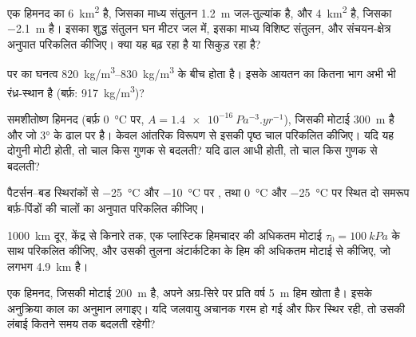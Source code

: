 \begin{exercise}[$\star$]\label{exo:b3:glaciology:3}
एक हिमनद का  \qty{6}{km^2} है, जिसका माध्य संतुलन
\qty{+1.2}{m} जल-तुल्यांक है, और  \qty{4}{km^2} है, जिसका
\qty{-2.1}{m} है। इसका शुद्ध संतुलन घन मीटर जल में, इसका माध्य विशिष्ट संतुलन,
और संचयन-क्षेत्र अनुपात परिकलित कीजिए। क्या यह बढ़ रहा है या
सिकुड़ रहा है?
\end{exercise}

\begin{exercise}[$\star$]\label{exo:b3:glaciology:4}
 पर  का घनत्व \qtyrange{820}{830}{kg/m^3} के बीच होता है।
इसके आयतन का कितना भाग अभी भी रंध्र-स्थान है (बर्फ़:
\qty{917}{kg/m^3})?
\end{exercise}

\begin{exercise}[$\star\star$]\label{exo:b3:glaciology:5}
समशीतोष्ण हिमनद (बर्फ़ \qty{0}{\celsius} पर, $A =
\qty{1.4e-16}{Pa^{-3}.yr^{-1}}$), जिसकी मोटाई \qty{300}{m} है और जो
\ang{3} के ढाल पर है। केवल आंतरिक विरूपण से इसकी पृष्ठ चाल परिकलित कीजिए।
यदि यह दोगुनी मोटी होती, तो चाल किस गुणक से बदलती? यदि ढाल
आधी होती, तो चाल किस गुणक से बदलती?
\end{exercise}

\begin{exercise}[$\star\star$]\label{exo:b3:glaciology:6}
पैटर्सन--बड स्थिरांकों से \qty{-25}{\celsius} और \qty{-10}{\celsius} पर , तथा
\qty{0}{\celsius} और \qty{-25}{\celsius} पर स्थित दो समरूप बर्फ़-पिंडों की चालों का अनुपात
परिकलित कीजिए।
\end{exercise}

\begin{exercise}[$\star\star$]\label{exo:b3:glaciology:7}
\qty{1000}{km} दूर, केंद्र से किनारे तक, एक प्लास्टिक हिमचादर की अधिकतम मोटाई
$\tau_0 = \qty{100}{kPa}$ के साथ परिकलित कीजिए, और उसकी तुलना अंटार्कटिका के
हिम की अधिकतम मोटाई से कीजिए, जो लगभग \qty{4.9}{km} है।
\end{exercise}

\begin{exercise}[$\star\star$]\label{exo:b3:glaciology:8}
एक हिमनद, जिसकी मोटाई \qty{200}{m} है, अपने अग्र-सिरे पर प्रति वर्ष
\qty{5}{m} हिम खोता है। इसके अनुक्रिया काल का अनुमान लगाइए।
यदि जलवायु अचानक गरम हो गई और फिर स्थिर रही, तो उसकी लंबाई कितने समय तक बदलती रहेगी?
\end{exercise}

